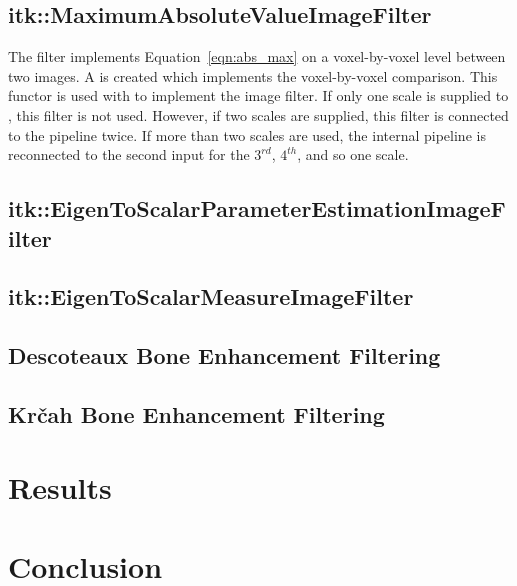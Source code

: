 \documentclass{InsightArticle}
\begin{document}
\subsection{itk::MaximumAbsoluteValueImageFilter}
\label{filter:MaximumAbsoluteValueImageFilter}
The filter  implements Equation~\ref{eqn:abs_max} on a voxel-by-voxel level between two images.
A  is created which implements the voxel-by-voxel comparison.
This functor is used with  to implement the image filter.
If only one scale is supplied to , this filter is not used.
However, if two scales are supplied, this filter is connected to the pipeline twice.
If more than two scales are used, the internal pipeline is reconnected to the second input for the $3^{rd}$, $4^{th}$, and so one scale.

\subsection{itk::EigenToScalarParameterEstimationImageFilter}
\label{filter:EigenToScalarParameterEstimationImageFilter}


\subsection{itk::EigenToScalarMeasureImageFilter}
\label{filter:EigenToScalarMeasureImageFilter}


\subsection{Descoteaux Bone Enhancement Filtering}
\label{subsec:descoteaux}




\subsection{Kr{\v{c}}ah Bone Enhancement Filtering}
\label{subsec:descoteaux}



\section{Results}
\label{sec:results}



\section{Conclusion}
\label{sec:conclusions}
\end{document}

